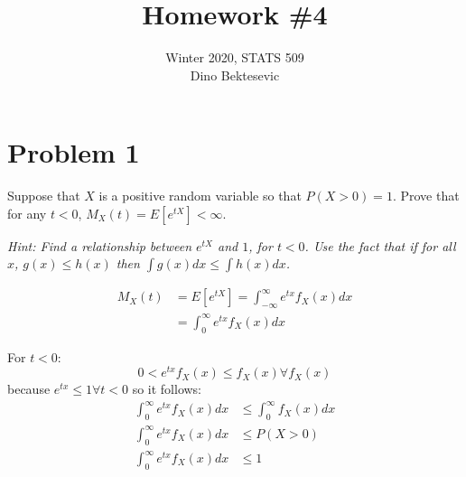 \documentclass{article}
\date{{}}
\newcommand{\1}{\mathbf{1}}
\begin{document}
\title{Homework \#4}
\author{\normalsize{Winter 2020, STATS 509}\\
\normalsize{Dino Bektesevic}}
\maketitle

\section*{Problem 1}
Suppose that $X$ is a positive random variable so that 
$P(X > 0) = 1$. Prove that for any $t<0$, $M_X(t) = E[e^{tX}] < \infty$.

\emph{Hint: Find a relationship between $e^{tX}$ and $1$, for $t < 0$.
Use the fact that if for all $x$, $g(x) \leq h(x)$ then $\int g(x) dx \leq \int h(x)dx$.}

\begin{align*}
    M_X(t)  &= E[e^{tX}] = \int_{-\infty}^\infty e^{tx} f_X(x) dx \\
    &= \int_0^\infty e^{tx} f_X(x) dx
\end{align*}

For $t<0$:
$$ 0 < e^{tx} f_X(x) \leq f_X(x) \forall f_X(x)$$
because $e^{tx}\leq 1 \forall t<0$ so it follows:
\begin{align*}
    \int_0^\infty e^{tx} f_X(x) dx &\leq \int_0^\infty f_X(x) dx \\
     \int_0^\infty e^{tx} f_X(x) dx &\leq P(X>0) \\
      \int_0^\infty e^{tx} f_X(x) dx &\leq 1
\end{align*}




\newpage
\end{document}
